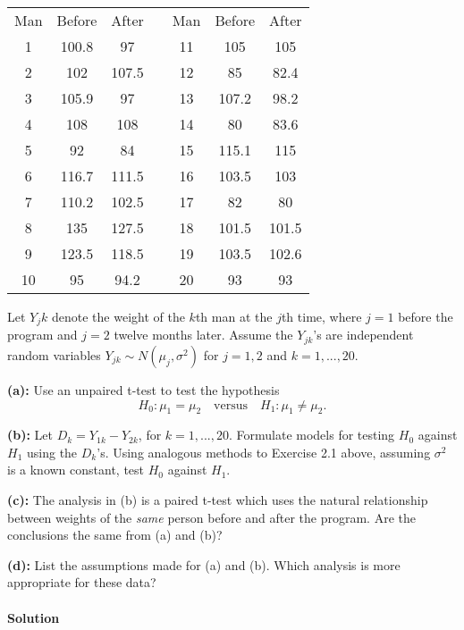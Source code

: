 \documentclass[]{article}
\let\oldparagraph\paragraph
\renewcommand{\paragraph}[1]{\oldparagraph{#1}\mbox{}}
\begin{document}
\begin{center}
\begin{tabular}{@{}ccccccc@{}}
\toprule
Man & Before & After &  & Man & Before & After \\ \cmidrule(r){1-3} \cmidrule(l){5-7} 
1   & 100.8  & 97    &  & 11  & 105    & 105   \\
2   & 102    & 107.5 &  & 12  & 85     & 82.4  \\
3   & 105.9  & 97    &  & 13  & 107.2  & 98.2  \\
4   & 108    & 108   &  & 14  & 80     & 83.6  \\
5   & 92     & 84    &  & 15  & 115.1  & 115   \\
6   & 116.7  & 111.5 &  & 16  & 103.5  & 103   \\
7   & 110.2  & 102.5 &  & 17  & 82     & 80    \\
8   & 135    & 127.5 &  & 18  & 101.5  & 101.5 \\
9   & 123.5  & 118.5 &  & 19  & 103.5  & 102.6 \\
10  & 95     & 94.2  &  & 20  & 93     & 93    \\ \bottomrule
\end{tabular}
\end{center}

Let \(Y_jk\) denote the weight of the \(k\)th man at the \(j\)th time,
where \(j = 1\) before the program and \(j = 2\) twelve months later.
Assume the \(Y_{jk}\)'s are independent random variables
\(Y_{jk} \sim N(\mu_j, \sigma^2)\) for \(j = 1,2\) and \(k = 1,...,20\).

\textbf{(a):} Use an unpaired t-test to test the hypothesis \[
H_0 : \mu_1 = \mu_2 \quad \text{versus} \quad H_1: \mu_1 \neq \mu_2.
\]

\textbf{(b):} Let \(D_k = Y_{1k} - Y_{2k}\), for \(k = 1,...,20\).
Formulate models for testing \(H_0\) against \(H_1\) using the
\(D_k\)'s. Using analogous methods to Exercise 2.1 above, assuming
\(\sigma^2\) is a known constant, test \(H_0\) against \(H_1\).

\textbf{(c):} The analysis in (b) is a paired t-test which uses the
natural relationship between weights of the \emph{same} person before
and after the program. Are the conclusions the same from (a) and (b)?

\textbf{(d):} List the assumptions made for (a) and (b). Which analysis
is more appropriate for these data?

\paragraph{Solution}\label{solution-1}
\end{document}
